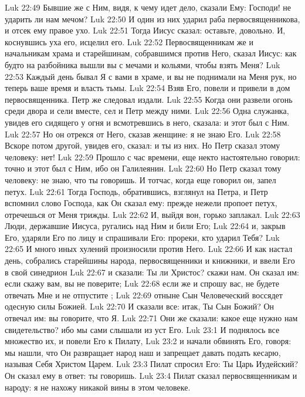\vs Luk 22:49 Бывшие же с Ним, видя, к чему идет дело, сказали Ему: Господи! не ударить ли нам мечом?
\vs Luk 22:50 И один из них ударил раба первосвященникова, и отсек ему правое ухо.
\vs Luk 22:51 Тогда Иисус сказал: оставьте, довольно. И, коснувшись уха его, исцелил его.
\vs Luk 22:52 Первосвященникам же и начальникам храма и старейшинам, собравшимся против Него, сказал Иисус: как будто на разбойника вышли вы с мечами и кольями, чтобы взять Меня?
\vs Luk 22:53 Каждый день бывал Я с вами в храме, и вы не поднимали на Меня рук, но теперь ваше время и власть тьмы.
\rsbpar\vs Luk 22:54 Взяв Его, повели и привели в дом первосвященника. Петр же следовал издали.
\vs Luk 22:55 Когда они развели огонь среди двора и сели вместе, сел и Петр между ними.
\vs Luk 22:56 Одна служанка, увидев его сидящего у огня и всмотревшись в него, сказала: и этот был с Ним.
\vs Luk 22:57 Но он отрекся от Него, сказав женщине: я не знаю Его.
\vs Luk 22:58 Вскоре потом другой, увидев его, сказал: и ты из них. Но Петр сказал этому человеку: нет!
\vs Luk 22:59 Прошло с час времени, еще некто настоятельно говорил: точно и этот был с Ним, ибо он Галилеянин.
\vs Luk 22:60 Но Петр сказал тому человеку: не знаю, что ты говоришь. И тотчас, когда еще говорил он, запел петух.
\vs Luk 22:61 Тогда Господь, обратившись, взглянул на Петра, и Петр вспомнил слово Господа, как Он сказал ему: прежде нежели пропоет петух, отречешься от Меня трижды.
\vs Luk 22:62 И, выйдя вон, горько заплакал.
\rsbpar\vs Luk 22:63 Люди, державшие Иисуса, ругались над Ним и били Его;
\vs Luk 22:64 и, закрыв Его, ударяли Его по лицу и спрашивали Его: прореки, кто ударил Тебя?
\vs Luk 22:65 И много иных хулений произносили против Него.
\rsbpar\vs Luk 22:66 И как настал день, собрались старейшины народа, первосвященники и книжники, и ввели Его в свой синедрион
\vs Luk 22:67 и сказали: Ты ли Христос? скажи нам. Он сказал им: если скажу вам, вы не поверите;
\vs Luk 22:68 если же и спрошу вас, не будете отвечать Мне и не отпустите ;
\vs Luk 22:69 отныне Сын Человеческий воссядет одесную силы Божией.
\vs Luk 22:70 И сказали все: итак, Ты Сын Божий? Он отвечал им: вы говорите, что Я.
\vs Luk 22:71 Они же сказали: какое еще нужно нам свидетельство? ибо мы сами слышали из уст Его.
\vs Luk 23:1 И поднялось все множество их, и повели Его к Пилату,
\vs Luk 23:2 и начали обвинять Его, говоря: мы нашли, что Он развращает народ наш и запрещает давать подать кесарю, называя Себя Христом Царем.
\vs Luk 23:3 Пилат спросил Его: Ты Царь Иудейский? Он сказал ему в ответ: ты говоришь.
\vs Luk 23:4 Пилат сказал первосвященникам и народу: я не нахожу никакой вины в этом человеке.
